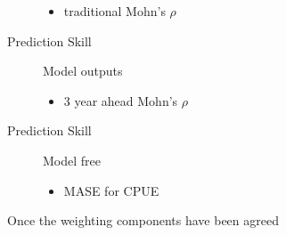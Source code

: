 \begin{description}
\begin{itemize}
    \item traditional Mohn's $\rho$
\end{itemize}
\item[Prediction Skill] Model outputs
 \begin{itemize}
    \item 3 year ahead Mohn's $\rho$ 
\end{itemize}
\item[Prediction Skill] Model free
\begin{itemize}
    \item MASE for CPUE
\end{itemize}
\end{description}

Once the weighting components have been agreed 